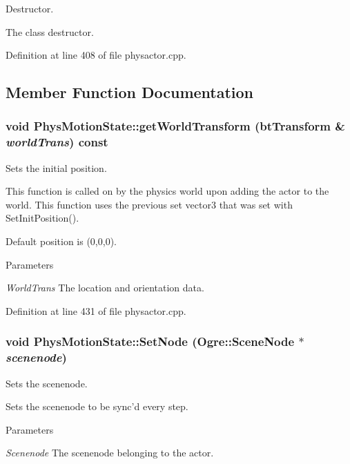 Destructor. 

The class destructor. 

Definition at line 408 of file physactor.cpp.



\subsection{Member Function Documentation}
\hypertarget{classPhysMotionState_ad7f6fc932da90cc2a718fbe809d95287}{
\subsubsection[{getWorldTransform}]{\setlength{\rightskip}{0pt plus 5cm}void PhysMotionState::getWorldTransform (btTransform \& {\em worldTrans}) const}}
\label{d2/d14/classPhysMotionState_ad7f6fc932da90cc2a718fbe809d95287}


Sets the initial position. 

This function is called on by the physics world upon adding the actor to the world. This function uses the previous set vector3 that was set with SetInitPosition(). \par
 Default position is (0,0,0). 
\begin{DoxyParams}{Parameters}
\item[{\em WorldTrans}]The location and orientation data. \end{DoxyParams}


Definition at line 431 of file physactor.cpp.

\hypertarget{classPhysMotionState_a4ba21f0b58f33197b61cf1a9754027bc}{
\subsubsection[{SetNode}]{\setlength{\rightskip}{0pt plus 5cm}void PhysMotionState::SetNode (Ogre::SceneNode $\ast$ {\em scenenode})}}
\label{d2/d14/classPhysMotionState_a4ba21f0b58f33197b61cf1a9754027bc}


Sets the scenenode. 

Sets the scenenode to be sync'd every step. 
\begin{DoxyParams}{Parameters}
\item[{\em Scenenode}]The scenenode belonging to the actor. \end{DoxyParams}


